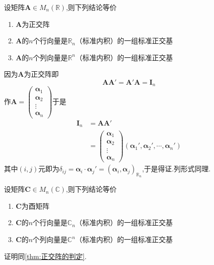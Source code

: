 \begin{formal}
    \begin{theorem}[正交阵的判定]\label{thm:正交阵的判定}
        设矩阵$\bm{A}\in M_n\left(\mathbb{R}\right)$,则下列结论等价\begin{enumerate}[label={\textup{(\arabic*)}}]
            \item $\bm{A}$为正交阵
            \item $\bm{A}$的$n$个行向量是$\mathbb{R}_n$（标准内积）的一组标准正交基
            \item $\bm{A}$的$n$个列向量是$\mathbb{R}^n$（标准内积）的一组标准正交基
        \end{enumerate}
    \end{theorem}
    \begin{Proof}
        因为$\bm{A}$为正交阵即\[
        \bm{AA}'=\bm{A}'\bm{A}=\bm{I}_n
        \]作$\bm{A}=\begin{pmatrix}
            \bm{\alpha}_1\\\bm{\alpha}_2\\\vdots\\\bm{\alpha}_n
        \end{pmatrix}$于是\begin{align*}
            \bm{I}_n&=\bm{AA}'\\
            &=\begin{pmatrix}
                \bm{\alpha}_1\\\bm{\alpha}_2\\\vdots\\\bm{\alpha}_n
            \end{pmatrix}\left(
                \bm{\alpha}_1',\bm{\alpha}_2',\cdots,\bm{\alpha}_n'
            \right)
        \end{align*}其中$\left(i,j\right)$元即为$\delta_{ij}=\bm{\alpha}_i\cdot\bm{\alpha}_j'=\left(\bm{\alpha}_i,\bm{\alpha}_j\right)_{\mathbb{R}_n}$,于是得证.列形式同理.
    \end{Proof}
\end{formal}
\begin{formal}
    \begin{theorem}[酉矩阵的判定]\label{thm:酉矩阵的判定}
        设矩阵$\bm{C}\in M_n\left(\mathbb{C}\right)$,则下列结论等价\begin{enumerate}[label={\textup{(\arabic*)}}]
            \item $\bm{C}$为酉矩阵
            \item $\bm{C}$的$n$个行向量是$\mathbb{C}_n$（标准内积）的一组标准正交基
            \item $\bm{C}$的$n$个列向量是$\mathbb{C}^n$（标准内积）的一组标准正交基
        \end{enumerate}
    \end{theorem}
    \begin{Proof}
        证明同\cref{thm:正交阵的判定}.
    \end{Proof}
\end{formal}
